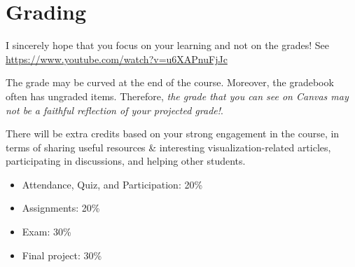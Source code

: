 \documentclass[11pt,article,oneside]{memoir} %
\begin{document}


\section{Grading}\label{sec:grading_tentative_}%

I sincerely hope that you focus on your learning and not on the grades! See \url{https://www.youtube.com/watch?v=u6XAPnuFjJc} 

The grade may be curved at the end of the course. Moreover, the gradebook often has ungraded items. Therefore, \emph{the grade that you can see on Canvas may not be a faithful reflection of your projected grade!}. 

There will be extra credits based on your strong engagement in the course, in terms of sharing useful resources \& interesting visualization-related articles, participating in discussions, and helping other students.

\begin{itemize}%

\item Attendance, Quiz, and Participation: 20\%

\item Assignments: 20\% 

\item Exam: 30\%

\item Final project: 30\%

\end{itemize}%
\end{document}
